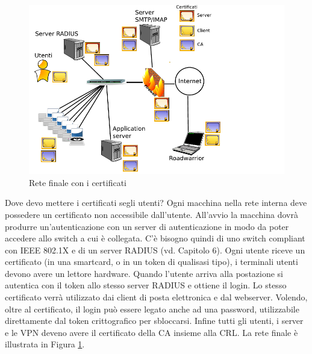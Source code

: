\newpage 

\begin{figure}[htbp]
	\centering
	\includegraphics[scale = 0.6]{images/network_example2.png}
	\caption{Rete finale con i certificati}
	\label{img:network_example2}
\end{figure} 

Dove devo mettere i certificati segli utenti? Ogni macchina nella rete interna deve possedere un certificato non accessibile dall’utente. All’avvio la macchina dovrà produrre un’autenticazione con un server di autenticazione in modo da poter accedere allo switch a cui è collegata. C’è bisogno quindi di uno switch compliant con IEEE 802.1X e di un server RADIUS (vd. Capitolo 6). Ogni utente riceve un certificato (in una smartcard, o in un token di qualisasi tipo), i terminali utenti devono avere un lettore hardware. Quando l’utente arriva alla postazione si autentica con il token allo stesso server RADIUS e ottiene il login. Lo stesso certificato verrà utilizzato dai client di posta elettronica e dal webserver. Volendo, oltre al certificato, il login può essere legato anche ad una password, utilizzabile direttamente dal token crittografico per sbloccarsi. Infine tutti gli utenti, i server e le VPN deveno avere il certificato della CA insieme alla CRL. La rete finale è illustrata in Figura \ref{img:network_example2}.


